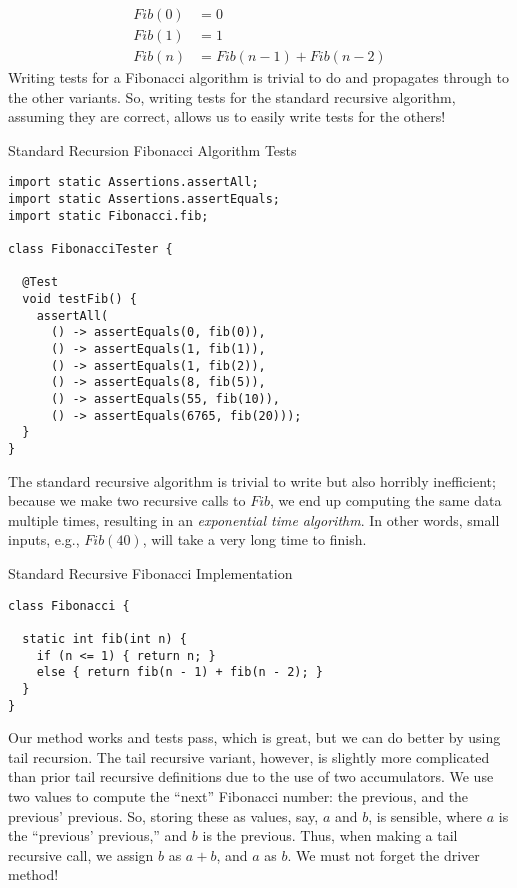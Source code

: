 \begin{align*}
  \textit{Fib}(0) &= 0\\
  \textit{Fib}(1) &= 1\\
  \textit{Fib}(n) &= \textit{Fib}(n - 1) + \textit{Fib}(n - 2)
\end{align*}
Writing tests for a Fibonacci algorithm is trivial to do and propagates through to the other variants. So, writing tests for the standard recursive algorithm, assuming they are correct, allows us to easily write tests for the others!

\begin{cl}[]{Standard Recursion Fibonacci Algorithm Tests}
\begin{lstlisting}[language=MyJava]
import static Assertions.assertAll;
import static Assertions.assertEquals;
import static Fibonacci.fib;

class FibonacciTester {

  @Test
  void testFib() {
    assertAll(
      () -> assertEquals(0, fib(0)),
      () -> assertEquals(1, fib(1)),
      () -> assertEquals(1, fib(2)),
      () -> assertEquals(8, fib(5)),
      () -> assertEquals(55, fib(10)),
      () -> assertEquals(6765, fib(20)));
  }
}
\end{lstlisting}
\end{cl}

The standard recursive algorithm is trivial to write but also horribly inefficient; because we make two recursive calls to $\textit{Fib}$, we end up computing the same data multiple times, resulting in an \textit{exponential time algorithm}. In other words, small inputs, e.g., $\textit{Fib}(40)$, will take a very long time to finish.

\begin{cl}[]{Standard Recursive Fibonacci Implementation}
\begin{lstlisting}[language=MyJava]
class Fibonacci {

  static int fib(int n) {
    if (n <= 1) { return n; } 
    else { return fib(n - 1) + fib(n - 2); }
  }
}
\end{lstlisting}
\end{cl}

Our method works and tests pass, which is great, but we can do better by using tail recursion. The tail recursive variant, however, is slightly more complicated than prior tail recursive definitions due to the use of two accumulators. We use two values to compute the ``next'' Fibonacci number: the previous, and the previous' previous. So, storing these as values, say, $a$ and $b$, is sensible, where $a$ is the ``previous' previous,'' and $b$ is the previous. Thus, when making a tail recursive call, we assign $b$ as $a + b$, and $a$ as $b$. We must not forget the driver method!

